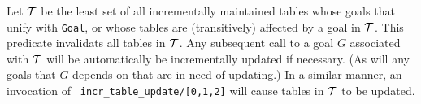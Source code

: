 \begin{description}


%

Let ${\cal T}$ be the least set of all incrementally maintained tables
whose goals that unify with {\tt Goal}, or whose tables are
(transitively) affected by a goal in ${\cal T}$.  This predicate invalidats
all tables in ${\cal T}$.  Any subsequent call to a goal $G$ associated
with ${\cal T}$ will be automatically be incrementally updated if
necessary.  (As will any goals that $G$ depends on that are in need of
updating.)  In a similar manner, an invocation of {\tt
  incr\_table\_update/[0,1,2]} will cause tables in ${\cal T}$ to be
updated.


\end{description}
